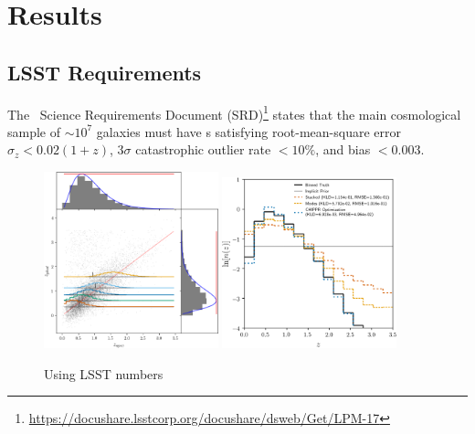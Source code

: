 \section{Results}


\subsection{LSST Requirements}

The \lsst\ Science Requirements Document (SRD)\footnote{\url{https://docushare.lsstcorp.org/docushare/dsweb/Get/LPM-17}} states that the main cosmological sample of $\sim 10^{7}$ galaxies must have \pz s satisfying root-mean-square error $\sigma_z < 0.02 (1+z)$, $3 \sigma$ catastrophic outlier rate $< 10\%$, and bias $< 0.003$.

\begin{figure}
	\begin{center}
		\includegraphics[width=0.45\textwidth]{figures/chippr/lsst_scatter.png}
		\includegraphics[width=0.45\textwidth]{figures/chippr/lsst_log_estimators.png}
		\caption{Using LSST numbers}
	\end{center}
\end{figure}

